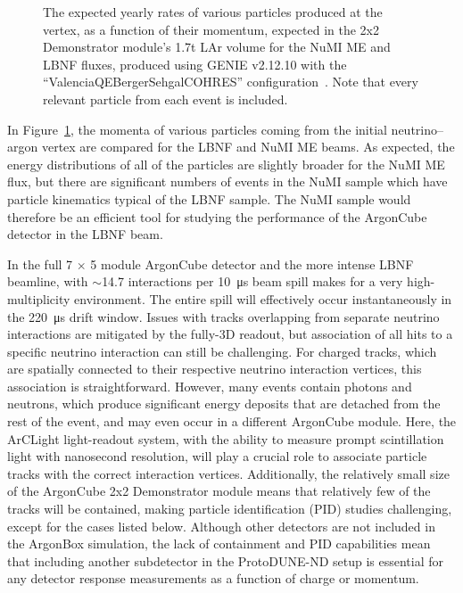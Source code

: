 \begin{figure}[htb]
  \caption{The expected yearly rates of various particles produced at the vertex, as a function of their momentum, expected in the 2x2 Demonstrator module's 1.7t LAr volume for the NuMI ME and LBNF fluxes, produced using GENIE v2.12.10 with the ``ValenciaQEBergerSehgalCOHRES'' configuration~\cite{genie}. Note that every relevant particle from each event is included.}
  \label{fig:momenta}
\end{figure}
In Figure~\ref{fig:momenta}, the momenta of various particles coming from the initial neutrino--argon vertex are compared for the LBNF and NuMI ME beams. As expected, the energy distributions of all of the particles are slightly broader for the NuMI ME flux, but there are significant numbers of events in the NuMI sample which have particle kinematics typical of the LBNF sample. The NuMI sample would therefore be an efficient tool for studying the performance of the ArgonCube detector in the LBNF beam.

In the full 7 $\times$ 5 module ArgonCube detector and the more intense LBNF beamline, with $\sim$14.7 interactions per \SI{10}{\micro\second} beam spill makes for a very high-multiplicity environment. The entire spill will effectively occur instantaneously in the \SI{220}{\micro\second} drift window. Issues with tracks overlapping from separate neutrino interactions are mitigated by the fully-3D readout, but association of all hits to a specific neutrino interaction can still be challenging. For charged tracks, which are spatially connected to their respective neutrino interaction vertices, this association is straightforward.  However, many events contain photons and neutrons, which produce significant energy deposits that are detached from the rest of the event, and may even occur in a different ArgonCube module. Here, the ArCLight light-readout system, with the ability to measure prompt scintillation light with nanosecond resolution, will play a crucial role to associate particle tracks with the correct interaction vertices. Additionally, the relatively small size of the ArgonCube 2x2 Demonstrator module means that relatively few of the tracks will be contained, making particle identification (PID) studies challenging, except for the cases listed below. Although other detectors are not included in the ArgonBox simulation, the lack of containment and PID capabilities mean that including another subdetector in the ProtoDUNE-ND setup is essential for any detector response measurements as a function of charge or momentum.


